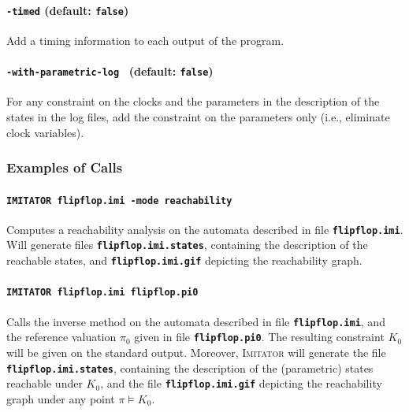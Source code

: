 \documentclass[a4paper,10pt]{article}
\newcommand{\imitator}{\textsc{Imitator}}
\newcommand{\imitatorExec}{\code{IMITATOR}}
\newcommand{\code}[1]{\textbf{\texttt{#1}}}
\begin{document}
\paragraph{\code{-timed} (default: \code{false})}
Add a timing information to each output of the program.


\paragraph{\code{-with-parametric-log } (default: \code{false})}
For any constraint on the clocks and the parameters in the description of the states in the log files,
add the constraint on the parameters only (i.e., eliminate clock variables).



\subsubsection{Examples of Calls}

\paragraph{\code{\imitatorExec{} flipflop.imi -mode reachability}}
Computes a reachability analysis on the automata described in file \code{flipflop.imi}.
Will generate files \code{flipflop.imi.states}, containing the description of the reachable states, and \code{flipflop.imi.gif} depicting the reachability graph.


\paragraph{\code{\imitatorExec{} flipflop.imi flipflop.pi0}}
Calls the inverse method on the automata described in file \code{flipflop.imi}, and the reference valuation $\pi_0$ given in file \code{flipflop.pi0}.
The resulting constraint $K_0$ will be given on the standard output.
Moreover, \imitator{} will generate the file \code{flipflop.imi.states}, containing the description of the (parametric) states reachable under $K_0$, and the file \code{flipflop.imi.gif} depicting the reachability graph under any point $\pi \models K_0$.
\end{document}
